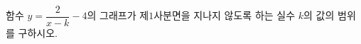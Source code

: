 \hspace*{2mm}\begin{minipage}[t]{\dimexpr\linewidth-2mm\relax}\vspace{0pt}
함수 $y=\dfrac{2}{x-k}-4$의 그래프가 제$1$사분면을 지나지 않도록 하는 실수 $k$의 값의 범위를 구하시오.\end{minipage}
